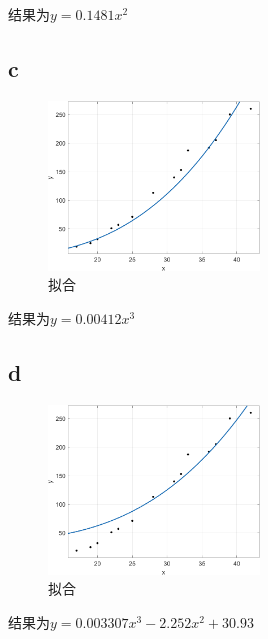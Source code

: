 \documentclass{article}
\begin{document}
结果为$y = 0.1481x^2$

\subsection{c}
\begin{figure}[!h]
    \centering
    \includegraphics[width=0.5\textwidth]{picture/hw4_7.png}
    \caption{拟合}
\end{figure}

结果为$y = 0.00412x^3$

\subsection{d}
\begin{figure}[!h]
    \centering
    \includegraphics[width=0.5\textwidth]{picture/hw4_8.png}
    \caption{拟合}
\end{figure}

结果为$y = 0.003307x^3 - 2.252x^2 + 30.93$
\end{document}
